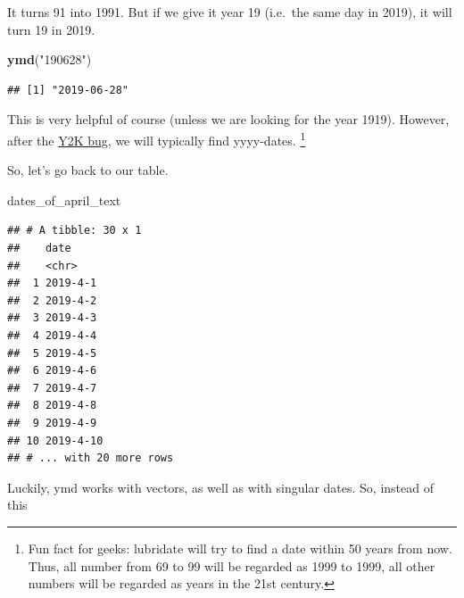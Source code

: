 \documentclass[]{tufte-book}
\newenvironment{Shaded}{}{}
\newcommand{\DataTypeTok}[1]{\textcolor[rgb]{0.56,0.13,0.00}{#1}}
\newcommand{\KeywordTok}[1]{\textcolor[rgb]{0.00,0.44,0.13}{\textbf{#1}}}
\newcommand{\NormalTok}[1]{#1}
\newcommand{\OperatorTok}[1]{\textcolor[rgb]{0.40,0.40,0.40}{#1}}
\newcommand{\StringTok}[1]{\textcolor[rgb]{0.25,0.44,0.63}{#1}}
\begin{document}
It turns 91 into 1991. But if we give it year 19 (i.e.~the same day in 2019), it will turn 19 in 2019.

\begin{Shaded}
\begin{Highlighting}[]
\KeywordTok{ymd}\NormalTok{(}\StringTok{"190628"}\NormalTok{)}
\end{Highlighting}
\end{Shaded}

\begin{verbatim}
## [1] "2019-06-28"
\end{verbatim}

This is very helpful of course (unless we are looking for the year 1919). However, after the \href{https://www.britannica.com/technology/Y2K-bug}{Y2K bug}, we will typically find yyyy-dates. \footnote{Fun fact for geeks: lubridate will try to find a date within 50 years from now. Thus, all number from 69 to 99 will be regarded as 1999 to 1999, all other numbers will be regarded as years in the 21st century.}

So, let's go back to our table.

\begin{Shaded}
\begin{Highlighting}[]
\NormalTok{dates_of_april_text}
\end{Highlighting}
\end{Shaded}

\begin{verbatim}
## # A tibble: 30 x 1
##    date     
##    <chr>    
##  1 2019-4-1 
##  2 2019-4-2 
##  3 2019-4-3 
##  4 2019-4-4 
##  5 2019-4-5 
##  6 2019-4-6 
##  7 2019-4-7 
##  8 2019-4-8 
##  9 2019-4-9 
## 10 2019-4-10
## # ... with 20 more rows
\end{verbatim}

Luckily, ymd works with vectors, as well as with singular dates. So, instead of this

\begin{Shaded}
\end{Shaded}
\end{document}
